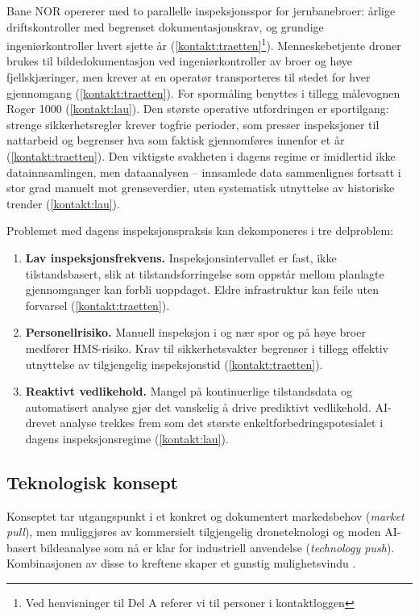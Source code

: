 Bane NOR opererer med to parallelle inspeksjonsspor for jernbanebroer: årlige driftskontroller med begrenset dokumentasjonskrav, og grundige ingeniørkontroller hvert sjette år (\cref{kontakt:traetten}\footnote{Ved henvisninger til Del A referer vi til personer i kontaktloggen}). Menneskebetjente droner brukes til bildedokumentasjon ved ingeniørkontroller av broer og høye fjellskjæringer, men krever at en operatør transporteres til stedet for hver gjennomgang (\cref{kontakt:traetten}). For spormåling benyttes i tillegg målevognen Roger 1000 (\cref{kontakt:lau}). Den største operative utfordringen er sportilgang: strenge sikkerhetsregler krever togfrie perioder, som presser inspeksjoner til nattarbeid og begrenser hva som faktisk gjennomføres innenfor et år (\cref{kontakt:traetten}). Den viktigste svakheten i dagens regime er imidlertid ikke datainnsamlingen, men dataanalysen -- innsamlede data sammenlignes fortsatt i stor grad manuelt mot grenseverdier, uten systematisk utnyttelse av historiske trender (\cref{kontakt:lau}).

Problemet med dagens inspeksjonspraksis kan dekomponeres i tre delproblem:

\begin{enumerate}
    \item \textbf{Lav inspeksjonsfrekvens.} Inspeksjonsintervallet er fast, ikke tilstandsbasert, slik at tilstandsforringelse som oppstår mellom planlagte gjennomganger kan forbli uoppdaget. Eldre infrastruktur kan feile uten forvarsel (\cref{kontakt:traetten}).
    \item \textbf{Personellrisiko.} Manuell inspeksjon i og nær spor og på høye broer medfører HMS-risiko. Krav til sikkerhetsvakter begrenser i tillegg effektiv utnyttelse av tilgjengelig inspeksjonstid (\cref{kontakt:traetten}).
    \item \textbf{Reaktivt vedlikehold.} Mangel på kontinuerlige tilstandsdata og automatisert analyse gjør det vanskelig å drive prediktivt vedlikehold. AI-drevet analyse trekkes frem som det største enkeltforbedringspotesialet i dagens inspeksjonsregime (\cref{kontakt:lau}).
\end{enumerate}

\subsection{Teknologisk konsept}

Konseptet tar utgangspunkt i et konkret og dokumentert markedsbehov (\textit{market pull}), men muliggjøres av kommersielt tilgjengelig droneteknologi og moden AI-basert bildeanalyse som nå er klar for industriell anvendelse (\textit{technology push}). Kombinasjonen av disse to kreftene skaper et gunstig mulighetsvindu \parencite{torvatn_teknologiledelse_2024}.

